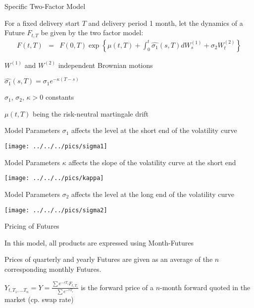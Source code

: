 {Specific  Two-Factor Model}

\item<1-> For a fixed delivery start $T$ and delivery period 1 month, let the dynamics of a Future $F_{t,T}$ be given by the two factor model:
\begin{eqnarray*}
F(t,T)& =&F(0,T)\exp\left\{\mu(t,T)  +\int_0^t\hat{\sigma_1}(s,T)dW_s^{(1)}+\sigma_2W_t^{(2)}\right\}
\end{eqnarray*}

\item<2-> $W^{(1)}$ and $W^{(2)}$ independent Brownian motions
\item<3-> $\hat{\sigma_1}(s,T)=\sigma_1e^{-\kappa(T-s)}$
\item<4-> $\sigma_1$, $\sigma_2$, $\kappa>0$ constants
\item<5-> $\mu(t,T)$ being the risk-neutral martingale drift

{Model Parameters}
$\sigma_1$ affects the level at the short end of the volatility curve

\begin{center}
\texttt{[image: ../../../pics/sigma1]}
\end{center}

{Model Parameters}
$\kappa$ affects the slope of the volatility curve at the short end

\begin{center}
\texttt{[image: ../../../pics/kappa]}
\end{center}

{Model Parameters}
$\sigma_2$ affects the level at the long end of the volatility curve

\begin{center}
\texttt{[image: ../../../pics/sigma2]}
\end{center}

{Pricing of Futures}
\item<1-> In this model, all products are expressed using Month-Futures
\item<2-> Prices of quarterly and yearly Futures are given as an
average of the  $n$ corresponding monthly Futures.
\item<3-> $Y_{t,T_1, \ldots T_n}=Y=\frac{\sum e^{-rT_i}F_{t,T_i}}{\sum e^{-rT_i}}$
is the forward price of a $n$-month forward quoted in the market (cp. swap rate)

